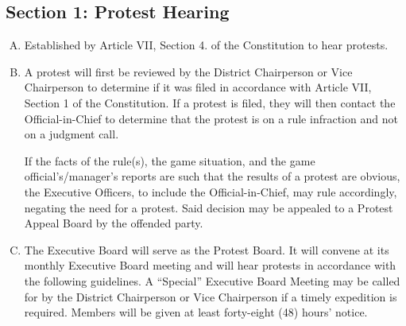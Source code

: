 \documentclass[draft]{memoir}
\begin{document}
\subsection{Section 1: Protest Hearing}
\begin{enumerate}[A.]
    \item Established by Article VII, Section 4. of the Constitution to hear protests.
    \item A protest will first be reviewed by the District Chairperson or Vice Chairperson to determine if it was filed in accordance with Article VII, Section 1 of the Constitution.  If a protest is filed, they will then contact the Official-in-Chief to determine that the protest is on a rule infraction and not on a judgment call.
    
    If the facts of the rule(s), the game situation, and the game official’s/manager’s reports are such that the results of a protest are obvious, the Executive Officers, to include the Official-in-Chief, may rule accordingly, negating the need for a protest.  Said decision may be appealed to a Protest Appeal Board by the offended party.
    \item The Executive Board will serve as the Protest Board. It will convene at its monthly Executive Board meeting and will hear protests in accordance with the following guidelines. A “Special” Executive Board Meeting may be called for by the District Chairperson or Vice Chairperson if a timely expedition is required. Members will be given at least forty-eight (48) hours’ notice.
\end{enumerate}
\end{document}
